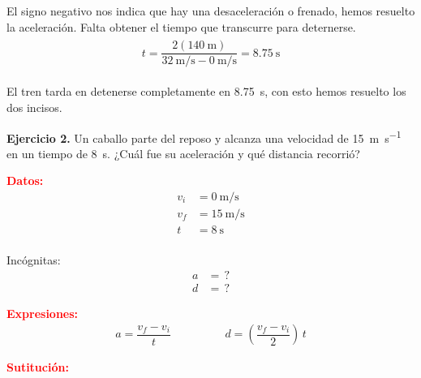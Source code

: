 \documentclass[14pt]{extarticle}
\newcommand{\textocolor}[2]{\textbf{\textcolor{#1}{#2}}}
\begin{document}
El signo negativo nos indica que hay una desaceleración o frenado, hemos resuelto la aceleración. Falta obtener el tiempo que transcurre para deternerse.
\begin{eqnarray*}
\begin{aligned}
t = \dfrac{2 (\SI{140}{\meter})}{\SI{32}{\meter\per\second} - \SI{0}{\meter\per\second}} = \SI{8.75}{\second}
\end{aligned}
\end{eqnarray*}

El tren tarda en detenerse completamente en \SI{8.75}{\second}, con esto hemos resuelto los dos incisos.

\vspace*{0.5cm}
\noindent
\textbf{Ejercicio 2.} Un caballo parte del reposo y alcanza una velocidad de \SI{15}{\meter\per\second} en un tiempo de \SI{8}{\second}. ¿Cuál fue su aceleración y qué distancia recorrió?

\begin{minipage}[t]{0.3\linewidth}
\textocolor{red}{Datos:}
\begin{align*}
v_{i} &= \SI{0}{\meter\per\second} \\
v_{f} &= \SI{15}{\meter\per\second} \\
t &= \SI{8}{\second} \\
\end{align*}
\end{minipage}
\hspace{0.1cm}
\begin{minipage}[t]{0.3\linewidth}
\hspace{1.5cm} Incógnitas:
\begin{align*}
a &= \, ? \\
d &= \, ?
\end{align*}
\end{minipage}

\vspace*{0.3cm}
\textocolor{red}{Expresiones:}
\begin{align*}
a = \dfrac{v_{f} - v_{i}}{t} \hspace{2cm}d = \left(\dfrac{v_{f} - v_{i}}{2} \right) \, t
\end{align*}

\vspace*{0.3cm}
\textocolor{red}{Sutitución:}
\end{document}
